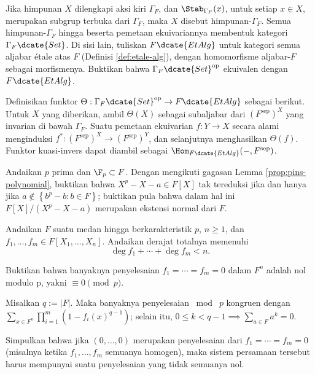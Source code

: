 \begin{Exercises}
	\item Jika himpunan $X$ dilengkapi aksi kiri $\Gamma_F$, dan $\Stab_{\Gamma_F}(x)$, untuk setiap $x \in X$, merupakan subgrup terbuka dari $\Gamma_F$, maka $X$ disebut himpunan-$\Gamma_F$. Semua himpunan-$\Gamma_F$ hingga beserta pemetaan ekuivariannya membentuk kategori $\Gamma_F\dcate{Set}$. Di sisi lain, tuliskan $F\dcate{EtAlg}$ untuk kategori semua aljabar étale atas $F$ (Definisi \ref{def:etale-alg}), dengan homomorfisme aljabar-$F$ sebagai morfismenya. Buktikan bahwa $\Gamma_F\dcate{Set}^\text{op}$ ekuivalen dengan $F\dcate{EtAlg}$.
	\begin{hint}
		Definisikan funktor $\Theta: \Gamma_F\dcate{Set}^\text{op} \to F\dcate{EtAlg}$ sebagai berikut. Untuk $X$ yang diberikan, ambil $\Theta(X)$ sebagai subaljabar dari $(F^\text{sep})^X$ yang invarian di bawah $\Gamma_F$. Suatu pemetaan ekuivarian $f: Y \to X$ secara alami menginduksi $f^*: (F^\text{sep})^X \to (F^\text{sep})^Y$, dan selanjutnya menghasilkan $\Theta(f)$. Funktor kuasi-invers dapat diambil sebagai $\Hom_{F\dcate{EtAlg}}(-, F^\text{sep})$.
	\end{hint}
	\item Andaikan $p$ prima dan $\F_p \subset F$. Dengan mengikuti gagasan Lemma \ref{prop:pins-polynomial}, buktikan bahwa $X^p - X - a \in F[X]$ tak tereduksi jika dan hanya jika $a \notin \left\{b^p -b : b \in F\right\}$; buktikan pula bahwa dalam hal ini $F[X]/(X^p-X-a)$ merupakan ekstensi normal dari $F$.
	\item Andaikan $F$ suatu medan hingga berkarakteristik $p$, $n \geq 1$, dan $f_1, \ldots, f_m \in F[X_1, \ldots, X_n]$. Andaikan derajat totalnya memenuhi
		\[ \deg f_1 + \cdots + \deg f_m < n. \]
		\begin{compactenum}[(i)]
			\item Buktikan bahwa banyaknya penyelesaian $f_1 = \cdots = f_m = 0$ dalam $F^n$ adalah nol modulo p, yakni $\equiv 0 \pmod p$.
			\begin{hint}
				Misalkan $q := |F|$. Maka banyaknya penyelesaian $\bmod\; p$ kongruen dengan $\sum_{x \in F^n} \prod_{i=1}^m \left( 1 - f_i(x)^{q-1} \right)$; selain itu, $0 \leq k < q-1 \implies \sum_{a \in F} a^k = 0$.
			\end{hint}
			\item Simpulkan bahwa jika $(0, \ldots, 0)$ merupakan penyelesaian dari $f_1 = \cdots = f_m = 0$ (misalnya ketika $f_1, \ldots, f_m$ semuanya homogen), maka sistem persamaan tersebut harus mempunyai suatu penyelesaian yang tidak semuanya nol.

\end{compactenum}
\end{Exercises}
